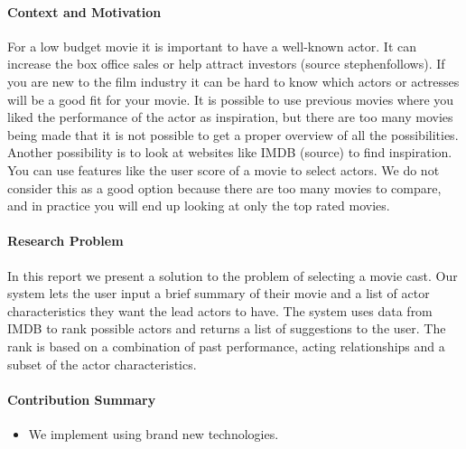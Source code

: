 
\noindent

\paragraph{Context and Motivation}
For a low budget movie it is important to have a well-known actor. It can increase the box office sales or help attract investors (source stephenfollows).
If you are new to the film industry it can be hard to know which actors or actresses will be a good fit for your movie.
It is possible to use previous movies where you liked the performance of the actor as inspiration, but there are too many movies
being made that it is not possible to get a proper overview of all the possibilities. Another possibility is to look at websites like
IMDB (source) to find inspiration. You can use features like the user score of a movie to select actors. We do not consider this
as a good option because there are too many movies to compare, and in practice you will end up looking at only the top rated movies.

\paragraph{Research Problem}
In this report we present a solution to the problem of selecting a movie cast. Our system lets the user input a brief summary of their
movie and a list of actor characteristics they want the lead actors to have. The system uses data from IMDB to rank possible actors
and returns a list of suggestions to the user. The rank is based on a combination of past performance, acting relationships and
a subset of the actor characteristics. 

\paragraph{Contribution Summary}
\begin{itemize}
\item We implement \paxos using brand new technologies.
\end{itemize}